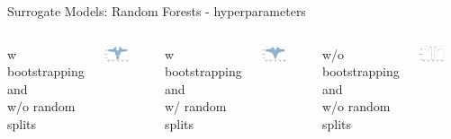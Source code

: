 \begin{frame}[c]{Surrogate Models: Random Forests - hyperparameters}

\begin{columns}
	\centering
	w bootstrapping and\\ w/o random splits
	
	\includegraphics[width=0.6\textwidth]{images/surrogate_models/rf_boot_middle_split.png}
	
	
	w bootstrapping and\\ w/ random splits
	
	\includegraphics[width=0.6\textwidth]{images/surrogate_models/rf_boot_rand_split.png}

	\centering
	w/o bootstrapping and\\ w/o random splits
	
	\includegraphics[width=0.6\textwidth]{images/surrogate_models/rf_noboot_middle_split.png}
	

\end{columns}
\end{frame}
